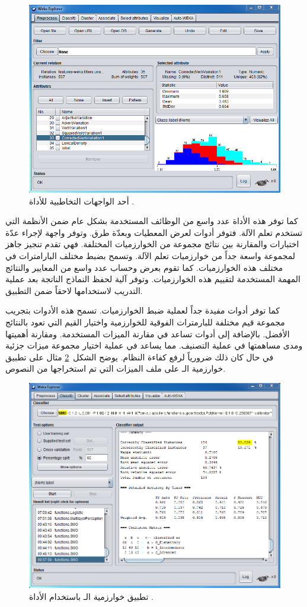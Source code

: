 \begin{figure}[htb]
	\centering
	\includegraphics[width=0.9\linewidth]{images/weka.png}
	\caption{%
		أحد الواجهات التخاطبية للأداة .
	}
	\label{fig:weka:gui}
\end{figure}

كما توفر هذه الأداة عدد واسع من الوظائف المستخدمة بشكل عام ضمن الأنظمة التي تستخدم تعلم الآلة.
فتوفر أدوات لعرض المعطيات وبعدّة طرق.
وتوفر واجهة لإجراء عدّة اختبارات والمقارنة بين نتائج مجموعة من الخوارزميات المختلفة.
فهي تقدم تنجيز جاهز  لمجموعة واسعة جداً من خوارزميات تعلم الآلة.
وتسمح بضبط مختلف البارامترات في مختلف هذه الخوارزميات.
كما تقوم بعرض وحساب عدد واسع من المعايير والنتائج المهمة المستخدمة لتقييم هذه الخوارزميات.
وتوفر آلية لحفظ النماذج الناتجة بعد عملية التدريب لاستخدامها لاحقاً ضمن التطبيق.
	
كما توفر أدوات مفيدة جداً لعملية ضبط الخوارزميات.
تسمح هذه الأدوات بتجريب مجموعة قيم مختلفة للبارمترات الفوقية للخوارزمية
واختيار القيم التي تعود بالنتائج الأفضل.
بالإضافة إلى أدوات تساعد في مقارنة الميزات المستخدمة.
ومقارنة أهميتها ومدى مساهمتها في عملية التصنيف.
مما يساعد في عملية اختيار مجموعة ميزات جزئية  في حال كان ذلك ضرورياً لرفع كفاءة النظام.
يوضح الشكل~\ref{fig:weka:ex} مثال على تطبيق خوارزمية الـ 
على ملف الميزات التي تم استخراجها من النصوص.

\begin{figure}[htb]
	\centering
	\includegraphics[width=0.9\linewidth]{images/weka-ex.png}
	\caption{%
		تطبيق خوارزمية الـ  باستخدام الأداة .
	}
	\label{fig:weka:ex}
\end{figure}


